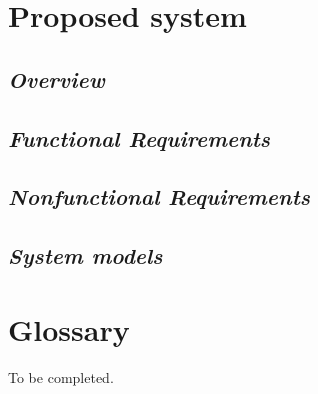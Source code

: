 \documentclass[a4paper]{article}
\begin{document}
\section{Proposed system}
	\begin{minipage}{0.9\textwidth}
		\subsection{\textit{Overview}}
		
		
		\subsection{\textit{Functional Requirements}}
		
		
		\subsection{\textit{Nonfunctional Requirements}}
		
		
		\subsection{\textit{System models}}
		
		
	\end{minipage}

\newpage
\section{Glossary}
	To be completed.
	
\end{document}
